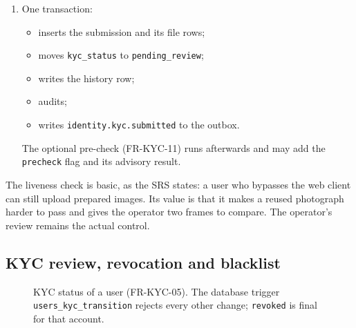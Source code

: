 \documentclass[11pt,a4paper]{article}
\begin{document}
\begin{enumerate}[nosep]
  Flags only route a submission for closer review; they never decide it (FR-KYC-03, FR-KYC-04).
  \item One transaction:
  \begin{itemize}[nosep]
    \item inserts the submission and its file rows;
    \item moves \texttt{kyc\_status} to \texttt{pending\_review};
    \item writes the history row;
    \item audits;
    \item writes \texttt{identity.kyc.submitted} to the outbox.
  \end{itemize}
  The optional pre-check (FR-KYC-11) runs afterwards and may add the \texttt{precheck} flag and its advisory result.
\end{enumerate}
The liveness check is basic, as the SRS states: a user who bypasses the web client can still upload prepared images. Its value is that it makes a reused photograph harder to pass and gives the operator two frames to compare. The operator's review remains the actual control.

\subsection{KYC review, revocation and blacklist}
\label{sec:flow-review}

\begin{figure}[!htbp]
\centering
{}
\caption{KYC status of a user (FR-KYC-05). The database trigger \texttt{users\_kyc\_transition} rejects every other change; \texttt{revoked} is final for that account.}
\label{fig:kyc-states}
\end{figure}
\end{document}
